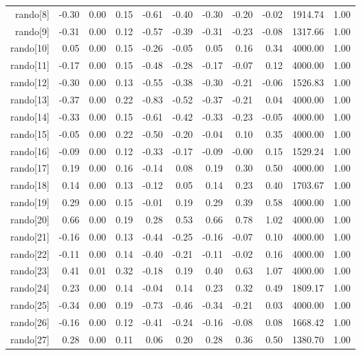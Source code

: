 \begin{table}[ht]
\begin{tabular}{rrrrrrrrrrr}
  rando[8] & -0.30 & 0.00 & 0.15 & -0.61 & -0.40 & -0.30 & -0.20 & -0.02 & 1914.74 & 1.00 \\ 
  rando[9] & -0.31 & 0.00 & 0.12 & -0.57 & -0.39 & -0.31 & -0.23 & -0.08 & 1317.66 & 1.00 \\ 
  rando[10] & 0.05 & 0.00 & 0.15 & -0.26 & -0.05 & 0.05 & 0.16 & 0.34 & 4000.00 & 1.00 \\ 
  rando[11] & -0.17 & 0.00 & 0.15 & -0.48 & -0.28 & -0.17 & -0.07 & 0.12 & 4000.00 & 1.00 \\ 
  rando[12] & -0.30 & 0.00 & 0.13 & -0.55 & -0.38 & -0.30 & -0.21 & -0.06 & 1526.83 & 1.00 \\ 
  rando[13] & -0.37 & 0.00 & 0.22 & -0.83 & -0.52 & -0.37 & -0.21 & 0.04 & 4000.00 & 1.00 \\ 
  rando[14] & -0.33 & 0.00 & 0.15 & -0.61 & -0.42 & -0.33 & -0.23 & -0.05 & 4000.00 & 1.00 \\ 
  rando[15] & -0.05 & 0.00 & 0.22 & -0.50 & -0.20 & -0.04 & 0.10 & 0.35 & 4000.00 & 1.00 \\ 
  rando[16] & -0.09 & 0.00 & 0.12 & -0.33 & -0.17 & -0.09 & -0.00 & 0.15 & 1529.24 & 1.00 \\ 
  rando[17] & 0.19 & 0.00 & 0.16 & -0.14 & 0.08 & 0.19 & 0.30 & 0.50 & 4000.00 & 1.00 \\ 
  rando[18] & 0.14 & 0.00 & 0.13 & -0.12 & 0.05 & 0.14 & 0.23 & 0.40 & 1703.67 & 1.00 \\ 
  rando[19] & 0.29 & 0.00 & 0.15 & -0.01 & 0.19 & 0.29 & 0.39 & 0.58 & 4000.00 & 1.00 \\ 
  rando[20] & 0.66 & 0.00 & 0.19 & 0.28 & 0.53 & 0.66 & 0.78 & 1.02 & 4000.00 & 1.00 \\ 
  rando[21] & -0.16 & 0.00 & 0.13 & -0.44 & -0.25 & -0.16 & -0.07 & 0.10 & 4000.00 & 1.00 \\ 
  rando[22] & -0.11 & 0.00 & 0.14 & -0.40 & -0.21 & -0.11 & -0.02 & 0.16 & 4000.00 & 1.00 \\ 
  rando[23] & 0.41 & 0.01 & 0.32 & -0.18 & 0.19 & 0.40 & 0.63 & 1.07 & 4000.00 & 1.00 \\ 
  rando[24] & 0.23 & 0.00 & 0.14 & -0.04 & 0.14 & 0.23 & 0.32 & 0.49 & 1809.17 & 1.00 \\ 
  rando[25] & -0.34 & 0.00 & 0.19 & -0.73 & -0.46 & -0.34 & -0.21 & 0.03 & 4000.00 & 1.00 \\ 
  rando[26] & -0.16 & 0.00 & 0.12 & -0.41 & -0.24 & -0.16 & -0.08 & 0.08 & 1668.42 & 1.00 \\ 
  rando[27] & 0.28 & 0.00 & 0.11 & 0.06 & 0.20 & 0.28 & 0.36 & 0.50 & 1380.70 & 1.00 \\ 

\end{tabular}
\end{table}
